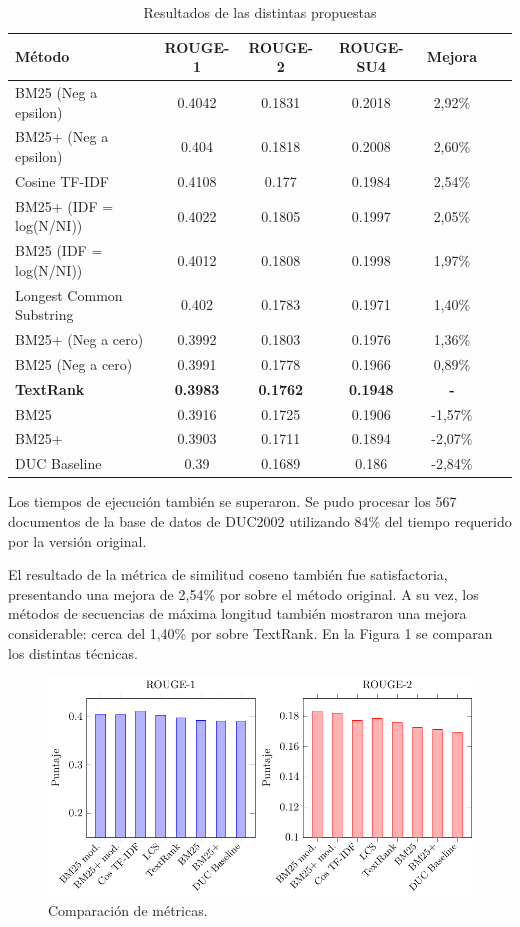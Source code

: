 \documentclass{llncs}
\begin{document}
\begin{table}
\caption{Resultados de las distintas propuestas}
\begin{center}
\begin{tabular}{l*{5}{c}r}
\hline
\rule{0pt}{12pt}
Método & ROUGE-1 & ROUGE-2 & ROUGE-SU4 & Mejora \\[2pt]
\hline\rule{0pt}{12pt}\mbox{}\par\nobreak
BM25 (Neg a epsilon) & 0.4042 & 0.1831 & 0.2018 & 2,92\% \\
BM25+ (Neg a epsilon) & 0.404 & 0.1818 & 0.2008 & 2,60\% \\
Cosine TF-IDF & 0.4108 & 0.177 & 0.1984 & 2,54\% \\
BM25+ (IDF = log(N/NI)) & 0.4022 & 0.1805 & 0.1997 & 2,05\% \\ 
BM25 (IDF = log(N/NI)) & 0.4012 & 0.1808 & 0.1998 & 1,97\% \\ 
Longest Common Substring & 0.402 & 0.1783 & 0.1971 & 1,40\% \\
BM25+ (Neg a cero) & 0.3992 & 0.1803 & 0.1976 & 1,36\% \\ 
BM25 (Neg a cero) & 0.3991 & 0.1778 & 0.1966 & 0,89\% \\
\textbf{TextRank} & \textbf{0.3983} & \textbf{0.1762} & \textbf{0.1948} & \textbf{-}\\
BM25 & 0.3916 & 0.1725 & 0.1906 & -1,57\% \\
BM25+ & 0.3903 & 0.1711 & 0.1894 & -2,07\% \\
DUC Baseline & 0.39 & 0.1689 & 0.186 & -2,84\% \\ [2pt]
\hline
\end{tabular}
\end{center}
\end{table}


Los tiempos de ejecución también se superaron. Se pudo procesar los 567 documentos de la base de datos de DUC2002 utilizando 84\% del tiempo requerido por la versión original.

El resultado de la métrica de similitud coseno también fue satisfactoria, presentando una mejora de 2,54\% por sobre el método original. A su vez, los métodos de secuencias de máxima longitud también mostraron una mejora considerable: cerca del 1,40\% por sobre TextRank. En la Figura 1 se comparan los distintas técnicas.

\begin{figure}[h!]
    \centering
    \includegraphics[width=1\textwidth]{rouge-scores.pdf}
    \caption{Comparación de métricas.}
\end{figure}
\end{document}
